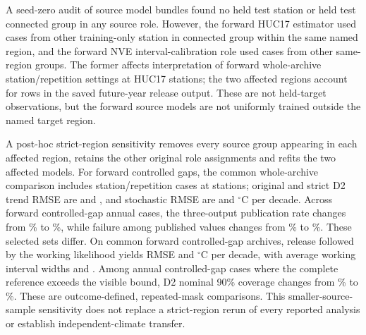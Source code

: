 \documentclass[draft,linenumbers]{agujournal2025}
\begin{document}






















A seed-zero audit of \RHModels{} source model bundles found no held test station or held test connected group in any source role. However, the forward HUC17 estimator used \RHHucCases{} cases from \RHHucStations{} other training-only station in \RHHucGroups{} connected group within the same named region, and the forward NVE interval-calibration role used \RHNveCases{} cases from \RHNveGroups{} other same-region groups. The former affects interpretation of \RHArchiveCases{} forward whole-archive station/repetition settings at \RHArchiveStations{} HUC17 stations; the two affected regions account for \RHFutureCases{} rows in the saved future-year release output. These are not held-target observations, but the forward source models are not uniformly trained outside the named target region.

A post-hoc strict-region sensitivity removes every source group appearing in each affected region, retains the other original role assignments and refits the two affected models. For forward controlled gaps, the common whole-archive comparison includes \SRPairN{} station/repetition cases at \SRPairStations{} stations; original and strict D2 trend RMSE are \SROldDTwo{} and \SRNewDTwo{}, and stochastic RMSE are \SROldStoch{} and \SRNewStoch{} $^{\circ}$C per decade. Across \SRFutureN{} forward controlled-gap annual cases, the three-output publication rate changes from \SROldRet\% to \SRNewRet\%, while failure among published values changes from \SROldRisk\% to \SRNewRisk\%. These selected sets differ. On \SRIntN{} common forward controlled-gap archives, release followed by the working likelihood yields RMSE \SRIntOld{} and \SRIntNew{}$^{\circ}$C per decade, with average working interval widths \SRIntOldWidth{} and \SRIntNewWidth{}. Among \SRAnnualN{} annual controlled-gap cases where the complete reference exceeds the visible bound, D2 nominal 90\% coverage changes from \SRAnnualOld\% to \SRAnnualNew\%. These are outcome-defined, repeated-mask comparisons. This smaller-source-sample sensitivity does not replace a strict-region rerun of every reported analysis or establish independent-climate transfer.
\end{document}
